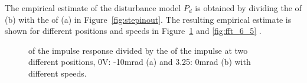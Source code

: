 The empirical estimate of the disturbance model $P_d$ is obtained by dividing the \abbrFFT of (b) with the \abbrFFT of (a) in Figure~\ref{fig:stepinout}. The resulting empirical estimate is shown for different positions and speeds in Figure~\ref{fig:fft0_3} and \ref{fig:fft_6_5} .

\begin{figure}[h!]
  \centering %
  \qquad
  \caption{\label{fig:fft0_3} \abbrFFT of the impulse response divided by the \abbrFFT of the impulse at two different positions, 0V: -10mrad (a) and 3.25: 0mrad (b) with different speeds.}
\end{figure}

